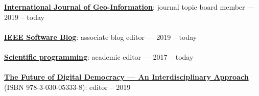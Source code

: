 \href{https://www.mdpi.com/journal/ijgi/}{\textbf{International Journal of Geo-Information}}: journal topic board member --- 2019 -- today
\\ \halfblankline \\
\href{http://blog.ieeesoftware.org/}{\textbf{IEEE Software Blog}}: associate blog editor --- 2019 -- today
\\ \halfblankline \\
\href{https://www.hindawi.com/journals/sp/}{\textbf{Scientific programming}}: academic editor --- 2017 -- today
\\ \halfblankline \\
\href{https://www.springer.com/gp/book/9783030053321}{\textbf{The Future of Digital Democracy --- An Interdisciplinary Approach}} (ISBN 978-3-030-05333-8): editor -- 2019
